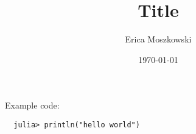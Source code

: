 \documentclass[12pt]{myarticle}
\author{Erica Moszkowski}
\title{Title}
\date{\today}
\begin{document}
\maketitle

{
  \hypersetup{linkcolor=black}
  \tableofcontents %
}

Example code:
\lstset{style=julia}
\begin{lstlisting}
  julia> println("hello world")
\end{lstlisting}


\clearpage


\end{document}
